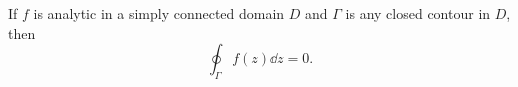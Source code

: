 \begin{theorem}\label{thm:cauchy-theorem}
  If $f$ is analytic in a simply connected domain $D$ and $\Gamma$ is any
  closed contour in $D$, then
  \[
    \oint_\Gamma f(z) \dd z = 0.
  \]
\end{theorem}
